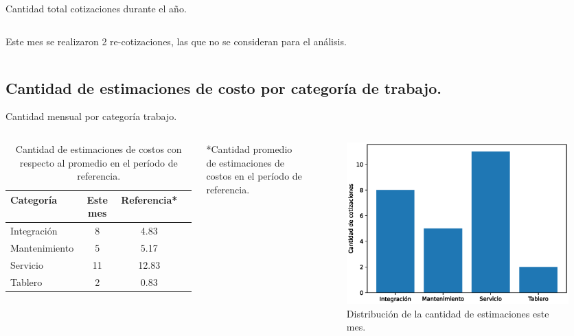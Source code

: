 \documentclass[aspectratio=169,xcolor=dvipsnames]{beamer}
\begin{document}
\begin{frame}{Cantidad total cotizaciones durante el año.}
\begin{columns}[c]
\begin{block}{}
    \scriptsize{Este mes se realizaron 2 re-cotizaciones, las que no se consideran para el análisis.}
\end{block}

\end{columns}

\end{frame}

\subsection{Cantidad de estimaciones de costo por categoría de trabajo.}
\begin{frame}{Cantidad mensual por categoría trabajo.}

\begin{columns}[c]
\begin{table}[h!]
\begin{tabular}{|l|c|c|c|}\hline
  \rowcolor{MediumBlue} \color{white} Categoría & \color{white}Este mes & \color{white}Referencia* \\\hline
Integración & 8 & 4.83 \\
Mantenimiento & 5 & 5.17 \\
Servicio & 11 & 12.83 \\
Tablero & 2 & 0.83 \\ \hline
\end{tabular}
\caption{Cantidad de estimaciones de costos con respecto al promedio en el período de referencia.}
\end{table}

\begin{block}{}
    \scriptsize{*Cantidad promedio de estimaciones de costos en el período de referencia.}
\end{block}

 \begin{figure}
     \includegraphics[width=\textwidth]{EPS/servicio_cantidad.eps}
     \caption{Distribución de la cantidad de estimaciones este mes.}
    \end{figure}

 \end{columns}
\end{frame}
\end{document}
